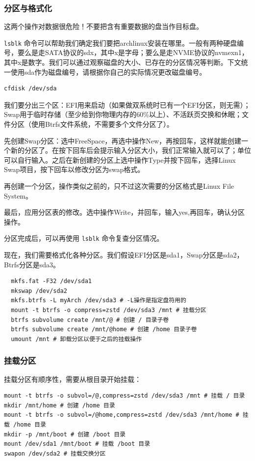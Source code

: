 \subsubsection{分区与格式化}

这两个操作对数据很危险！不要把含有重要数据的盘当作目标盘。

\texttt{lsblk} 命令可以帮助我们确定我们要把archlinux安装在哪里。一般有两种硬盘编号，要么是走SATA协议的sdx，其中x是字母；要么是走NVME协议的nvmexn1，其中x是数字。我们可以通过观察磁盘的大小、已存在的分区情况等判断。下文统一使用sda作为磁盘编号，请根据你自己的实际情况更改磁盘编号。

\begin{verbatim}
cfdisk /dev/sda
\end{verbatim}

我们要分出三个区：EFI用来启动（如果做双系统时已有一个EFI分区，则无需）；Swap用于临时存储（至少给到你物理内存的60\%以上）、不活跃页交换和休眠；文件分区（使用Btrfs文件系统，不需要多个文件分区了）。

先创建Swap分区：选中FreeSpace，再选中操作New，再按回车，这样就能创建一个新的分区了。在按下回车后会提示输入分区大小，我们正常输入就可以了；单位可以自行输入。之后在新创建的分区上选中操作Type并按下回车，选择Linux Swap项目，按下回车以修改分区为swap格式。

再创建一个分区，操作类似之前的，只不过这次需要的分区格式是Linux File System。

最后，应用分区表的修改。选中操作Write，并回车，输入yes,再回车，确认分区操作。

分区完成后，可以再使用 \texttt{lsblk} 命令复查分区情况。

现在，我们需要格式化各种分区。我们假设EFI分区是sda1，Swap分区是sda2，Btrfs分区是sda3。

\begin{verbatim}
  mkfs.fat -F32 /dev/sda1
  mkswap /dev/sda2
  mkfs.btrfs -L myArch /dev/sda3 # -L操作是指定盘符用的
  mount -t btrfs -o compress=zstd /dev/sda3 /mnt # 挂载分区
  btrfs subvolume create /mnt/@ # 创建 / 目录子卷
  btrfs subvolume create /mnt/@home # 创建 /home 目录子卷
  umount /mnt # 卸载分区以便于之后的挂载操作
\end{verbatim}

\subsubsection{挂载分区}

挂载分区有顺序性，需要从根目录开始挂载：

\begin{verbatim}
mount -t btrfs -o subvol=/@,compress=zstd /dev/sda3 /mnt # 挂载 / 目录
mkdir /mnt/home # 创建 /home 目录
mount -t btrfs -o subvol=/@home,compress=zstd /dev/sda3 /mnt/home # 挂载 /home 目录
mkdir -p /mnt/boot # 创建 /boot 目录
mount /dev/sda1 /mnt/boot # 挂载 /boot 目录
swapon /dev/sda2 # 挂载交换分区
\end{verbatim}

